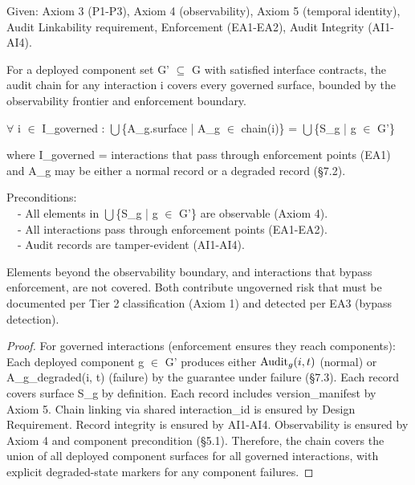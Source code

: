 \begin{cthm}
Given: Axiom 3 (P1-P3), Axiom 4 (observability), Axiom 5 (temporal identity), Audit Linkability requirement, Enforcement (EA1-EA2), Audit Integrity (AI1-AI4).

For a deployed component set G' $\subseteq$ G with satisfied interface contracts, the audit chain for any interaction i covers every governed surface, bounded by the observability frontier and enforcement boundary.

\begin{claddisp}
$\forall$ i $\in$ I\_governed : $\bigcup$\{A\_g.surface | A\_g $\in$ chain(i)\} = $\bigcup$\{S\_g | g $\in$ G'\}\\
\end{claddisp}
where I\_\allowbreak{}governed = interactions that pass through enforcement points (EA1) and A\_\allowbreak{}g may be either a normal record or a degraded record (\S{}7.2).

\begin{claddisp}
Preconditions:\\
~~- All elements in $\bigcup$\{S\_g | g $\in$ G'\} are observable (Axiom 4).\\
~~- All interactions pass through enforcement points (EA1-EA2).\\
~~- Audit records are tamper-evident (AI1-AI4).\\
\end{claddisp}
Elements beyond the observability boundary, and interactions that bypass enforcement, are not covered. Both contribute ungoverned risk that must be documented per Tier 2 classification (Axiom 1) and detected per EA3 (bypass detection).

\end{cthm}

\begin{proof}
For governed interactions (enforcement ensures they reach components):
Each deployed component g $\in$ G' produces either $\operatorname{Audit}_g(i,t)$ (normal) or A\_\allowbreak{}g\_\allowbreak{}degraded(i, t) (failure) by the guarantee under failure (\S{}7.3).
Each record covers surface S\_\allowbreak{}g by definition.
Each record includes version\_\allowbreak{}manifest by Axiom 5.
Chain linking via shared interaction\_\allowbreak{}id is ensured by Design Requirement.
Record integrity is ensured by AI1-AI4.
Observability is ensured by Axiom 4 and component precondition (\S{}5.1).
Therefore, the chain covers the union of all deployed component surfaces for all governed interactions, with explicit degraded-state markers for any component failures.

\end{proof}

